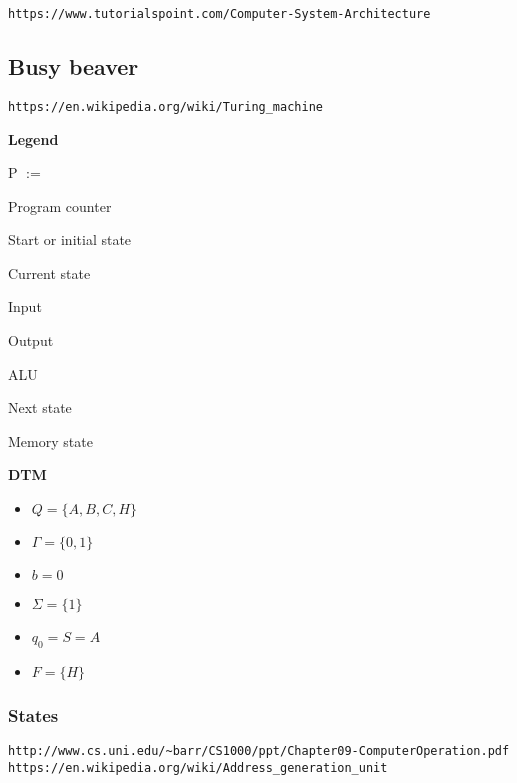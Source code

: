 \documentclass[10pt,a4paper]{article}
\begin{document}
\verb+https://www.tutorialspoint.com/Computer-System-Architecture+

\begin{tikzpicture}
\end{tikzpicture}

\vskip 16pt


\subsection{Busy beaver}

\verb+https://en.wikipedia.org/wiki/Turing_machine+

\vskip 8pt
{\bf Legend}
  
\vskip 4pt
\begin{labeling}{\rm P $:=$ } 
  \setlength\itemsep{-3pt}
  \item[\rm P $:=$] \rm Program counter
  \item[S $:=$] Start or initial state
  \item[C $:=$] Current state
  \item[I $:=$] Input
  \item[O $:=$] Output
  \item[A $:=$] ALU
  \item[N $:=$] Next state
  \item[M $:=$] Memory state
\end{labeling}

\vskip 8pt
{\bf DTM}
  
\vskip 15pt
\hskip -15pt
\begin{minipage}{0.9\textwidth}
  \begin{itemize}
    \setlength\itemsep{0em}
    
  \item $Q = \{ A, B, C, H \}$
  \item $\Gamma = \{ 0, 1 \}$
  \item $b = 0$
  \item $\Sigma = \{ 1 \}$
  \item $q_0 = S = A$
  \item $F = \{ H \}$ 
    
  \end{itemize}
\end{minipage}

\subsubsection{States}
\verb+http://www.cs.uni.edu/~barr/CS1000/ppt/Chapter09-ComputerOperation.pdf+
\verb+https://en.wikipedia.org/wiki/Address_generation_unit+
\end{document}
